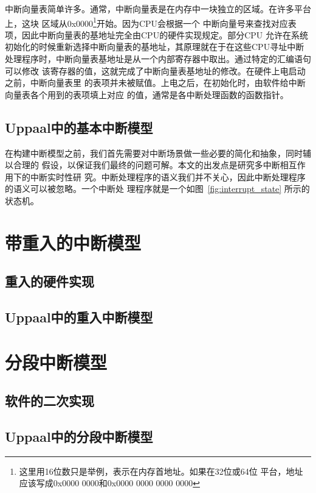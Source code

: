 中断向量表简单许多。通常，中断向量表是在内存中一块独立的区域。在许多平台上，这块
区域从0x0000\footnote{这里用16位数只是举例，表示在内存首地址。如果在32位或64位
平台，地址应该写成0x0000 0000和0x0000 0000 0000 0000}开始。因为CPU会根据一个
中断向量号来查找对应表项，因此中断向量表的基地址完全由CPU的硬件实现规定。部分CPU
允许在系统初始化的时候重新选择中断向量表的基地址，其原理就在于在这些CPU寻址中断
处理程序时，中断向量表基地址是从一个内部寄存器中取出。通过特定的汇编语句可以修改
该寄存器的值，这就完成了中断向量表基地址的修改。在硬件上电启动之前，中断向量表里
的表项并未被赋值。上电之后，在初始化时，由软件给中断向量表各个用到的表项填上对应
的值，通常是各中断处理函数的函数指针。

\subsection{Uppaal中的基本中断模型}
\label{subsec:basic_uppaal}

在构建中断模型之前，我们首先需要对中断场景做一些必要的简化和抽象，同时辅以合理的
假设，以保证我们最终的问题可解。本文的出发点是研究多中断相互作用下的中断实时性研
究。中断处理程序的语义我们并不关心，因此中断处理程序的语义可以被忽略。一个中断处
理程序就是一个如图~\ref{fig:interrupt_state} 所示的状态机。

\section{带重入的中断模型}
\label{sec:reentrant}

\subsection{重入的硬件实现}
\label{subsec:reentrant_hardware}

\subsection{Uppaal中的重入中断模型}
\label{subsec:reentrant_uppaal}

\section{分段中断模型}
\label{sec:segment}

\subsection{软件的二次实现}
\label{subsec:segment_software}

\subsection{Uppaal中的分段中断模型}
\label{subsec:segment_uppaal}